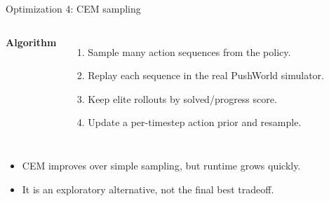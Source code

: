 \documentclass[aspectratio=169]{beamer}
\begin{document}
\begin{frame}{Optimization 4: CEM sampling}
  \small
  \begin{columns}[T]
    \textbf{Algorithm}
    \begin{enumerate}
      \item Sample many action sequences from the policy.
      \item Replay each sequence in the real PushWorld simulator.
      \item Keep elite rollouts by solved/progress score.
      \item Update a per-timestep action prior and resample.
    \end{enumerate}

    \centering
  \end{columns}

  \vspace{0.6em}
  \begin{itemize}
    \item CEM improves over simple sampling, but runtime grows quickly.
    \item It is an exploratory alternative, not the final best tradeoff.
  \end{itemize}
\end{frame}
\end{document}
